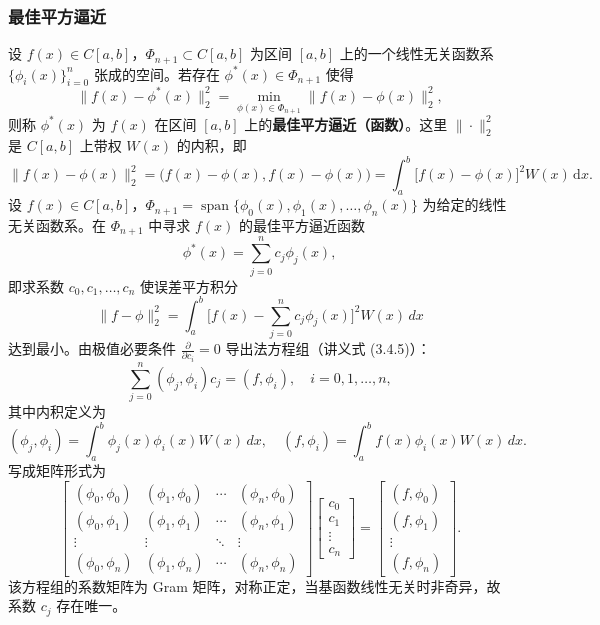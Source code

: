 \documentclass{article}
\begin{document}
\subsubsection{最佳平方逼近}
设 $f(x)\in C[a,b]$，$\Phi_{n+1}\subset C[a,b]$ 为区间 $[a,b]$ 上的一个线性无关函数系 $\{\phi_i(x)\}_{i=0}^{n}$ 张成的空间。若存在 $\phi^{*}(x)\in \Phi_{n+1}$ 使得
\[
\| f(x) - \phi^{*}(x) \|_{2}^{2} = \min_{\phi(x)\in \Phi_{n+1}} \| f(x) - \phi(x) \|_{2}^{2},
\]
则称 $\phi^{*}(x)$ 为 $f(x)$ 在区间 $[a,b]$ 上的\textbf{最佳平方逼近（函数）}。这里 $\|\cdot\|_{2}^{2}$ 是 $C[a,b]$ 上带权 $W(x)$ 的内积，即
\[
\| f(x) - \phi(x) \|_{2}^{2} = \bigl( f(x)-\phi(x), f(x)-\phi(x) \bigr) = \int_{a}^{b} \bigl[ f(x) - \phi(x) \bigr]^{2} W(x) \, \mathrm{d}x.
\]
设 $f(x)\in C[a,b]$，$\Phi_{n+1}=\operatorname{span}\{\phi_0(x),\phi_1(x),\dots,\phi_n(x)\}$ 为给定的线性无关函数系。在 $\Phi_{n+1}$ 中寻求 $f(x)$ 的最佳平方逼近函数
\[
\phi^*(x) = \sum_{j=0}^n c_j \phi_j(x),
\]
即求系数 $c_0,c_1,\dots,c_n$ 使误差平方积分
\[
\|f-\phi\|_2^2 = \int_a^b \bigl[ f(x) - \sum_{j=0}^n c_j \phi_j(x) \bigr]^2 W(x)\,dx
\]
达到最小。由极值必要条件 $\frac{\partial}{\partial c_i}=0$ 导出法方程组（讲义式 (3.4.5)）：
\[
\sum_{j=0}^n (\phi_j,\phi_i) c_j = (f,\phi_i), \quad i=0,1,\dots,n,
\]
其中内积定义为
\[
(\phi_j,\phi_i) = \int_a^b \phi_j(x)\phi_i(x) W(x)\,dx, \quad (f,\phi_i) = \int_a^b f(x)\phi_i(x) W(x)\,dx.
\]
写成矩阵形式为
\[
\begin{bmatrix}
(\phi_0,\phi_0) & (\phi_1,\phi_0) & \cdots & (\phi_n,\phi_0) \\
(\phi_0,\phi_1) & (\phi_1,\phi_1) & \cdots & (\phi_n,\phi_1) \\
\vdots & \vdots & \ddots & \vdots \\
(\phi_0,\phi_n) & (\phi_1,\phi_n) & \cdots & (\phi_n,\phi_n)
\end{bmatrix}
\begin{bmatrix}
c_0 \\ c_1 \\ \vdots \\ c_n
\end{bmatrix}
=
\begin{bmatrix}
(f,\phi_0) \\ (f,\phi_1) \\ \vdots \\ (f,\phi_n)
\end{bmatrix}.
\]
该方程组的系数矩阵为 Gram 矩阵，对称正定，当基函数线性无关时非奇异，故系数 $c_j$ 存在唯一。
\end{document}
